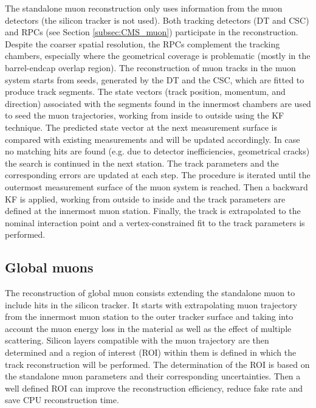 The standalone muon reconstruction only uses information from the muon detectors (the silicon tracker is not used). Both tracking detectors (DT and CSC) and RPCs (see Section \ref{subsec:CMS_muon}) participate in the reconstruction. Despite the coarser spatial resolution, the RPCs complement the tracking chambers, especially where the geometrical coverage is problematic (mostly in the barrel-endcap overlap region). The reconstruction of muon tracks in the muon system starts from seeds, generated by the DT and the CSC, which are fitted to produce track segments. The state vectors (track position, momentum, and direction) associated with the segments found in the innermost chambers are used to seed the muon trajectories, working from inside to outside using the KF technique. The predicted state vector at the next measurement surface is compared with existing measurements and will be updated accordingly. In case no matching hits are found (e.g. due to detector inefficiencies, geometrical cracks) the search is continued in the next station. The track parameters and the corresponding errors are updated at each step. The procedure is iterated until the outermost measurement surface of the muon system is reached. Then a backward KF is applied, working from outside to inside and the track parameters are defined at the innermost muon station. Finally, the track is extrapolated to the nominal interaction point and a vertex-constrained fit to the track parameters is performed.

\subsection*{Global muons}\label{subsec:Global_muon}
The reconstruction of global muon consists extending the standalone muon to include hits in the silicon tracker. It starts with extrapolating muon trajectory from the innermost muon station to the outer tracker surface and taking into account the muon energy loss in the material as well as the effect of multiple scattering. Silicon layers compatible with the muon trajectory are then determined and a region of interest (ROI) within them is defined in which the track reconstruction will be performed. The determination of the ROI is based on the standalone muon parameters and their corresponding uncertainties. Then a well defined ROI can improve the reconstruction efficiency, reduce fake rate and save CPU reconstruction time.

